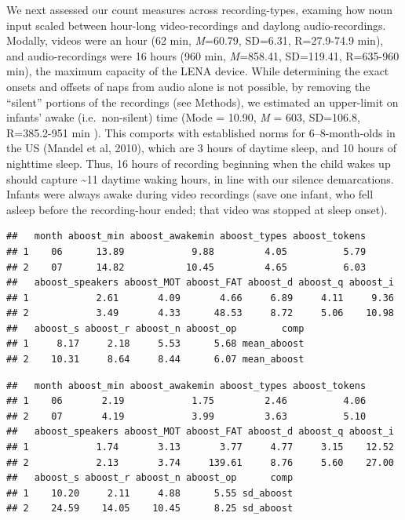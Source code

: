 \documentclass[man]{apa6}
\theoremstyle{definition}
\theoremstyle{definition}
\theoremstyle{definition}
\theoremstyle{remark}
\begin{document}
We next assessed our count measures across recording-types, examing how
noun input scaled between hour-long video-recordings and daylong
audio-recordings. Modally, videos were an hour (62 min, \emph{M}=60.79,
SD=6.31, R=27.9-74.9 min), and audio-recordings were 16 hours (960 min,
\emph{M}=858.41, SD=119.41, R=635-960 min), the maximum capacity of the
LENA device. While determining the exact onsets and offsets of naps from
audio alone is not possible, by removing the \enquote{silent} portions
of the recordings (see Methods), we estimated an upper-limit on infants'
awake (i.e.~non-silent) time (Mode = 10.90, \emph{M} = 603, SD=106.8,
R=385.2-951 min ). This comports with established norms for
6--8-month-olds in the US (Mandel et al, 2010), which are 3 hours of
daytime sleep, and 10 hours of nighttime sleep. Thus, 16 hours of
recording beginning when the child wakes up should capture
\textasciitilde{}11 daytime waking hours, in line with our silence
demarcations. Infants were always awake during video recordings (save
one infant, who fell asleep before the recording-hour ended; that video
was stopped at sleep onset).

\begin{verbatim}
##   month aboost_min aboost_awakemin aboost_types aboost_tokens
## 1    06      13.89            9.88         4.05          5.79
## 2    07      14.82           10.45         4.65          6.03
##   aboost_speakers aboost_MOT aboost_FAT aboost_d aboost_q aboost_i
## 1            2.61       4.09       4.66     6.89     4.11     9.36
## 2            3.49       4.33      48.53     8.72     5.06    10.98
##   aboost_s aboost_r aboost_n aboost_op        comp
## 1     8.17     2.18     5.53      5.68 mean_aboost
## 2    10.31     8.64     8.44      6.07 mean_aboost
\end{verbatim}

\begin{verbatim}
##   month aboost_min aboost_awakemin aboost_types aboost_tokens
## 1    06       2.19            1.75         2.46          4.06
## 2    07       4.19            3.99         3.63          5.10
##   aboost_speakers aboost_MOT aboost_FAT aboost_d aboost_q aboost_i
## 1            1.74       3.13       3.77     4.77     3.15    12.52
## 2            2.13       3.74     139.61     8.76     5.60    27.00
##   aboost_s aboost_r aboost_n aboost_op      comp
## 1    10.20     2.11     4.88      5.55 sd_aboost
## 2    24.59    14.05    10.45      8.25 sd_aboost
\end{verbatim}
\end{document}

